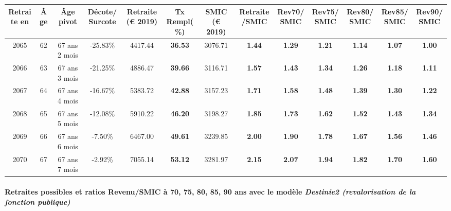 { \scriptsize \begin{center} 
\begin{tabular}[htb]{|c|c||c|c||c|c||c||c|c|c|c|c|c|} 
\hline 
 Retraite en &  Âge &  Âge pivot &  Décote/Surcote &  Retraite (\euro{} 2019) &  Tx Rempl(\%) &  SMIC (\euro{} 2019) &  Retraite/SMIC &  Rev70/SMIC &  Rev75/SMIC &  Rev80/SMIC &  Rev85/SMIC &  Rev90/SMIC \\ 
\hline \hline 
 2065 &  62 &  67 ans 2 mois &  -25.83\% &  4417.44 &  {\bf 36.53} &  3076.71 &  {\bf 1.44} &  {\bf 1.29} &  {\bf 1.21} &  {\bf 1.14} &  {\bf 1.07} &  {\bf 1.00} \\ 
\hline 
 2066 &  63 &  67 ans 3 mois &  -21.25\% &  4886.47 &  {\bf 39.66} &  3116.71 &  {\bf 1.57} &  {\bf 1.43} &  {\bf 1.34} &  {\bf 1.26} &  {\bf 1.18} &  {\bf 1.11} \\ 
\hline 
 2067 &  64 &  67 ans 4 mois &  -16.67\% &  5383.72 &  {\bf 42.88} &  3157.23 &  {\bf 1.71} &  {\bf 1.58} &  {\bf 1.48} &  {\bf 1.39} &  {\bf 1.30} &  {\bf 1.22} \\ 
\hline 
 2068 &  65 &  67 ans 5 mois &  -12.08\% &  5910.22 &  {\bf 46.20} &  3198.27 &  {\bf 1.85} &  {\bf 1.73} &  {\bf 1.62} &  {\bf 1.52} &  {\bf 1.43} &  {\bf 1.34} \\ 
\hline 
 2069 &  66 &  67 ans 6 mois &  -7.50\% &  6467.00 &  {\bf 49.61} &  3239.85 &  {\bf 2.00} &  {\bf 1.90} &  {\bf 1.78} &  {\bf 1.67} &  {\bf 1.56} &  {\bf 1.46} \\ 
\hline 
 2070 &  67 &  67 ans 7 mois &  -2.92\% &  7055.14 &  {\bf 53.12} &  3281.97 &  {\bf 2.15} &  {\bf 2.07} &  {\bf 1.94} &  {\bf 1.82} &  {\bf 1.70} &  {\bf 1.60} \\ 
\hline 
\hline 
\end{tabular} 
\end{center} } 
\paragraph{Retraites possibles et ratios Revenu/SMIC à 70, 75, 80, 85, 90 ans avec le modèle \emph{Destinie2 (revalorisation de la fonction publique)}}  
 
